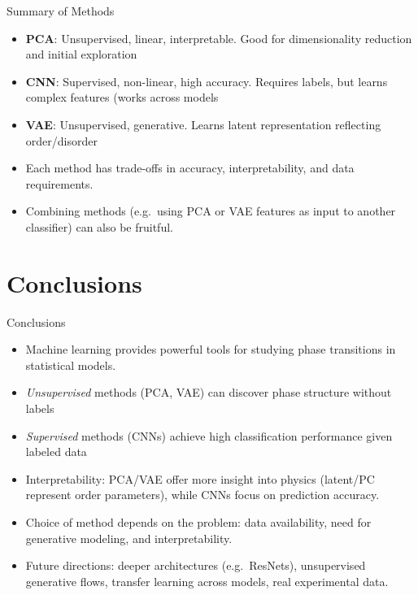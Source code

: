 \documentclass{beamer}
\begin{document}
\begin{frame}{Summary of Methods}
 \begin{itemize}
   \item \textbf{PCA}: Unsupervised, linear, interpretable. Good for dimensionality reduction and initial exploration
   \item \textbf{CNN}: Supervised, non-linear, high accuracy. Requires labels, but learns complex features (works across models 
   \item \textbf{VAE}: Unsupervised, generative. Learns latent representation reflecting order/disorder 
   \item Each method has trade-offs in accuracy, interpretability, and data requirements.
   \item Combining methods (e.g.\ using PCA or VAE features as input to another classifier) can also be fruitful.
 \end{itemize}
\end{frame}

\section{Conclusions}

\begin{frame}{Conclusions}
 \begin{itemize}
   \item Machine learning provides powerful tools for studying phase transitions in statistical models.
   \item \emph{Unsupervised} methods (PCA, VAE) can discover phase structure without labels 
   \item \emph{Supervised} methods (CNNs) achieve high classification performance given labeled data 
   \item Interpretability: PCA/VAE offer more insight into physics (latent/PC represent order parameters), while CNNs focus on prediction accuracy.
   \item Choice of method depends on the problem: data availability, need for generative modeling, and interpretability.
   \item Future directions: deeper architectures (e.g.\ ResNets), unsupervised generative flows, transfer learning across models, real experimental data.
 \end{itemize}
\end{frame}
\end{document}
